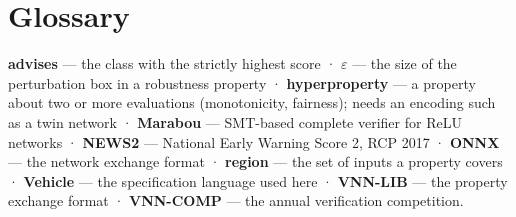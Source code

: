 \documentclass[11pt]{article}
\begin{document}
\section*{Glossary}
\textbf{advises} — the class with the strictly highest score · \textbf{$\varepsilon$} — the size of the perturbation box in a robustness property · \textbf{hyperproperty} — a property about two or more evaluations (monotonicity, fairness); needs an encoding such as a twin network · \textbf{Marabou} — SMT-based complete verifier for ReLU networks · \textbf{NEWS2} — National Early Warning Score 2, RCP 2017 · \textbf{ONNX} — the network exchange format · \textbf{region} — the set of inputs a property covers · \textbf{Vehicle} — the specification language used here · \textbf{VNN-LIB} — the property exchange format · \textbf{VNN-COMP} — the annual verification competition.
\end{document}
